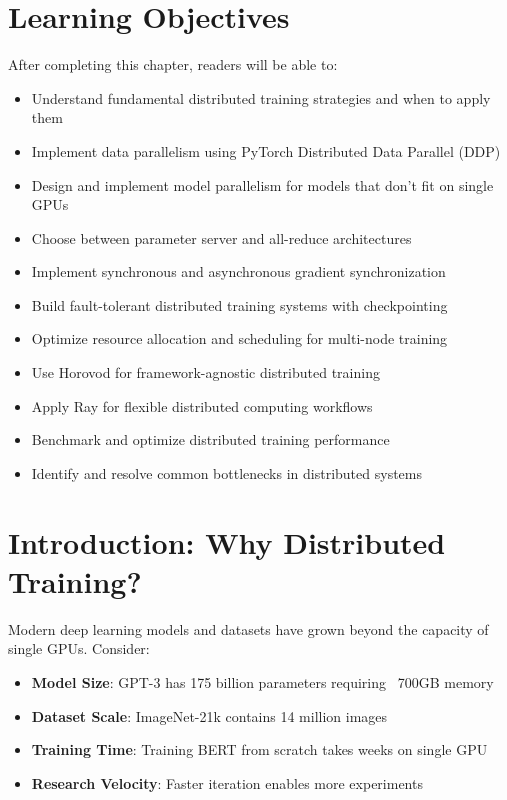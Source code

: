 \section{Learning Objectives}

After completing this chapter, readers will be able to:
\begin{itemize}
    \item Understand fundamental distributed training strategies and when to apply them
    \item Implement data parallelism using PyTorch Distributed Data Parallel (DDP)
    \item Design and implement model parallelism for models that don't fit on single GPUs
    \item Choose between parameter server and all-reduce architectures
    \item Implement synchronous and asynchronous gradient synchronization
    \item Build fault-tolerant distributed training systems with checkpointing
    \item Optimize resource allocation and scheduling for multi-node training
    \item Use Horovod for framework-agnostic distributed training
    \item Apply Ray for flexible distributed computing workflows
    \item Benchmark and optimize distributed training performance
    \item Identify and resolve common bottlenecks in distributed systems
\end{itemize}

\section{Introduction: Why Distributed Training?}

Modern deep learning models and datasets have grown beyond the capacity of single GPUs. Consider:

\begin{itemize}
    \item \textbf{Model Size}: GPT-3 has 175 billion parameters requiring ~700GB memory
    \item \textbf{Dataset Scale}: ImageNet-21k contains 14 million images
    \item \textbf{Training Time}: Training BERT from scratch takes weeks on single GPU
    \item \textbf{Research Velocity}: Faster iteration enables more experiments
\end{itemize}


